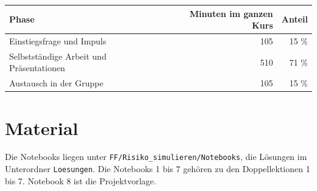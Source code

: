 \begin{center}
	\small
	\begin{tabular}{@{}lrr@{}}
		\midrule
		\textbf{Phase} & \textbf{Minuten im ganzen Kurs} & \textbf{Anteil} \\
		\midrule
		Einstiegsfrage und Impuls & 105 & 15 \% \\
		Selbstständige Arbeit und Präsentationen & 510 & 71 \% \\
		Austausch in der Gruppe & 105 & 15 \% \\
		\midrule
	\end{tabular}
\end{center}

\section{Material}
Die Notebooks liegen unter \texttt{FF/Risiko\_simulieren/Notebooks}, die Lösungen im Unterordner \texttt{Loesungen}. Die Notebooks 1 bis 7 gehören zu den Doppellektionen 1 bis 7. Notebook 8 ist die Projektvorlage.
